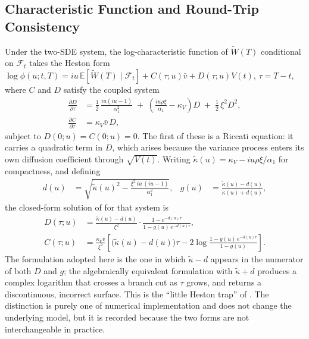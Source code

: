 \subsection{Characteristic Function and Round-Trip Consistency}
\label{sec:phase5-charfn}

Under the two-SDE system, the log-characteristic function of $\widetilde W(T)$ conditional on $\mathcal F_t$ takes the Heston \citeyearpar{Heston1993} form $\log\phi(u;t,T) = iu\,\mathbb E[\widetilde W(T)\mid\mathcal F_t] + C(\tau;u)\bar v + D(\tau;u) V(t)$, $\tau = T-t$, where $C$ and $D$ satisfy the coupled system
\begin{align}
\frac{\partial D}{\partial \tau} &= \frac{1}{2}\,\frac{iu(iu-1)}{\alpha_1^2} \;+\; \left(\frac{iu\rho\xi}{\alpha_1} - \kappa_V\right) D \;+\; \frac{1}{2}\,\xi^2 D^2, \\
\frac{\partial C}{\partial \tau} &= \kappa_V \bar v\, D,
\end{align}
subject to $D(0;u) = C(0;u) = 0$. The first of these is a Riccati equation: it carries a quadratic term in $D$, which arises because the variance process enters its own diffusion coefficient through $\sqrt{V(t)}$. Writing $\tilde\kappa(u) = \kappa_V - iu\rho\xi/\alpha_1$ for compactness, and defining
\begin{align}
d(u) &= \sqrt{\tilde\kappa(u)^2 - \frac{\xi^2\, iu\,(iu-1)}{\alpha_1^2}}, &
g(u) &= \frac{\tilde\kappa(u) - d(u)}{\tilde\kappa(u) + d(u)},
\end{align}
the closed-form solution of \citet{Heston1993} for that system is
\begin{align}
D(\tau;u) &= \frac{\tilde\kappa(u) - d(u)}{\xi^2} \cdot \frac{1 - e^{-d(u)\tau}}{1 - g(u)\,e^{-d(u)\tau}}, \\
C(\tau;u) &= \frac{\kappa_V \bar v}{\xi^2}\left[\bigl(\tilde\kappa(u) - d(u)\bigr)\tau - 2\log\frac{1 - g(u)\,e^{-d(u)\tau}}{1 - g(u)}\right].
\end{align}
The formulation adopted here is the one in which $\tilde\kappa - d$ appears in the numerator of both $D$ and $g$; the algebraically equivalent formulation with $\tilde\kappa + d$ produces a complex logarithm that crosses a branch cut as $\tau$ grows, and returns a discontinuous, incorrect surface. This is the ``little Heston trap'' of \citet{AlbrecherEtAl2007}. The distinction is purely one of numerical implementation and does not change the underlying model, but it is recorded because the two forms are not interchangeable in practice.

